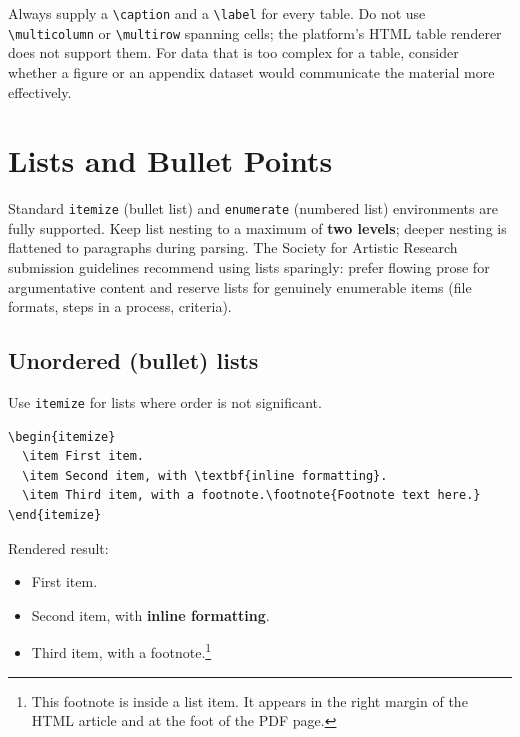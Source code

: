 Always supply a \verb|\caption| and a \verb|\label| for every table.
Do not use \verb|\multicolumn| or \verb|\multirow| spanning cells;
the platform's HTML table renderer does not support them. For data that
is too complex for a table, consider whether a figure or an appendix
dataset \citep{dataset_example} would communicate the material more
effectively.

\section{Lists and Bullet Points}

Standard \texttt{itemize} (bullet list) and \texttt{enumerate}
(numbered list) environments are fully supported. Keep list nesting
to a maximum of \textbf{two levels}; deeper nesting is flattened
to paragraphs during parsing. The Society for Artistic Research
submission guidelines \citep{sar2021guidelines} recommend using lists
sparingly: prefer flowing prose for argumentative content and reserve
lists for genuinely enumerable items (file formats, steps in a
process, criteria).

\subsection{Unordered (bullet) lists}

Use \texttt{itemize} for lists where order is not significant.

\begin{verbatim}
\begin{itemize}
  \item First item.
  \item Second item, with \textbf{inline formatting}.
  \item Third item, with a footnote.\footnote{Footnote text here.}
\end{itemize}
\end{verbatim}

Rendered result:

\begin{itemize}
  \item First item.
  \item Second item, with \textbf{inline formatting}.
  \item Third item, with a footnote.\footnote{%
    This footnote is inside a list item. It appears in the right margin
    of the HTML article and at the foot of the PDF page.%
  }
\end{itemize}


